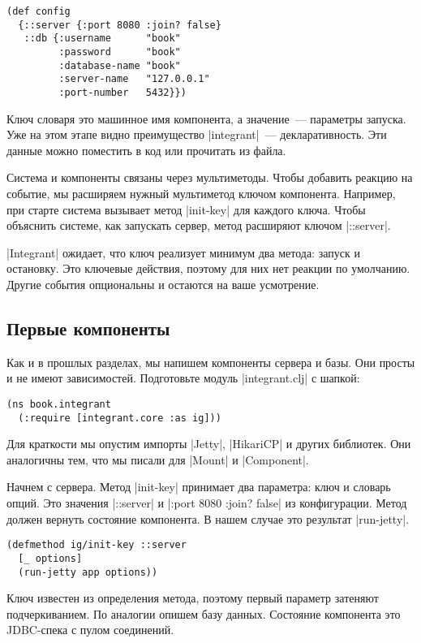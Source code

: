 \begin{verbatim}
(def config
  {::server {:port 8080 :join? false}
   ::db {:username      "book"
         :password      "book"
         :database-name "book"
         :server-name   "127.0.0.1"
         :port-number   5432}})
\end{verbatim}

Ключ словаря это машинное имя компонента, а значение~--- параметры запуска. Уже
на этом этапе видно преимущество \spverb|integrant|~--- декларативность. Эти
данные можно поместить в код или прочитать из файла.

Система и компоненты связаны через мультиметоды. Чтобы добавить реакцию на
событие, мы расширяем нужный мультиметод ключом компонента. Например, при старте
система вызывает метод \spverb|init-key| для каждого ключа. Чтобы объяснить
системе, как запускать сервер, метод расширяют ключом \spverb|::server|.

\spverb|Integrant| ожидает, что ключ реализует минимум два метода: запуск и
остановку. Это ключевые действия, поэтому для них нет реакции по
умолчанию. Другие события опциональны и остаются на ваше усмотрение.

\subsection{Первые компоненты}

Как и в прошлых разделах, мы напишем компоненты сервера и базы. Они просты и не
имеют зависимостей. Подготовьте модуль \spverb|integrant.clj| с шапкой:

\begin{verbatim}
(ns book.integrant
  (:require [integrant.core :as ig]))
\end{verbatim}

Для краткости мы опустим импорты \spverb|Jetty|, \spverb|HikariCP| и других
библиотек. Они аналогичны тем, что мы писали для \spverb|Mount| и
\spverb|Component|.

Начнем с сервера. Метод \spverb|init-key| принимает два параметра: ключ и
словарь опций. Это значения \spverb|::server| и \spverb|{:port 8080 :join? false}|
из конфигурации. Метод должен вернуть состояние компонента. В нашем
случае это результат \spverb|run-jetty|.

\begin{verbatim}
(defmethod ig/init-key ::server
  [_ options]
  (run-jetty app options))
\end{verbatim}

Ключ известен из определения метода, поэтому первый параметр затеняют
подчеркиванием. По аналогии опишем базу данных. Состояние компонента это
JDBC-спека с пулом соединений.


